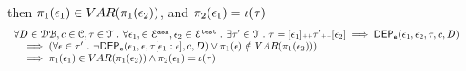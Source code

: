 \begin{lem}
\begin{itemize}
then 
$\pi_1(\mathtt{\epsilon}_1) \in VAR(\pi_1(\mathtt{\epsilon}_2))$, and $ {\pi_2(\mathtt{\epsilon}_1)} = \iota(\mathtt{\tau})$
%
\[
\begin{array}{l}
	\forall D \in \dbdom , c \in \cdom, \trace \in \mathcal{T} \st \forall \event_1,\in \eventset^{\asn}, \event_2 \in \eventset^{\test} \st
	 \exists \trace' \in \mathcal{T} \st \trace = [\event_1] \tracecat \trace' \tracecat [\event_2]
	\implies
	\eventdep(\event_1, \event_2, \trace, c, D) 
	\\ \quad 
	\implies 
	\left( \forall \event \in \trace' \st 
	\neg \eventdep(\event_1, \event, \trace[\event_1:\event], c, D)
	\lor  \pi_1(\event) \notin VAR(\pi_1(\event_2))
	\right) 
	\\ \quad 
	\implies 
	\pi_1(\event_1) \in VAR(\pi_1(\event_2)) \land {\pi_2(\event_1)} = \llabel(\trace)
\end{array}
\]
\end{itemize}
\end{lem}
%
